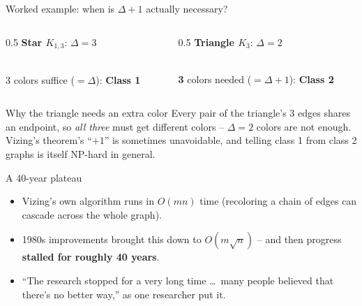 \documentclass[11pt,aspectratio=169]{beamer}
\begin{document}
\begin{frame}{Worked example: when is $\Delta+1$ actually necessary?}
  \begin{columns}
  \begin{column}{0.5\textwidth}
  \centering \textbf{Star $K_{1,3}$}: $\Delta = 3$
  \\[4pt] \footnotesize 3 colors suffice ($=\Delta$): \textbf{Class 1}
  \end{column}
  \begin{column}{0.5\textwidth}
  \centering \textbf{Triangle $K_3$}: $\Delta = 2$
  \\[4pt] \footnotesize \textbf{3} colors needed ($=\Delta+1$): \textbf{Class 2}
  \end{column}
  \end{columns}
  \vspace{0.6em}
  \begin{exampleblock}{Why the triangle needs an extra color}
    Every pair of the triangle's 3 edges shares an endpoint, so \emph{all three} must
    get different colors -- $\Delta=2$ colors are not enough. Vizing's theorem's
    ``$+1$'' is sometimes unavoidable, and telling class 1 from class 2 graphs is
    itself NP-hard in general.
  \end{exampleblock}
\end{frame}

\begin{frame}{A 40-year plateau}
  \begin{itemize}
    \item Vizing's own algorithm runs in $O(mn)$ time (recoloring a chain of edges can
    cascade across the whole graph).
    \item 1980s improvements brought this down to $O(m\sqrt n)$ -- and then progress
    \textbf{stalled for roughly 40 years}.
    \item ``The research stopped for a very long time \ldots\ many people believed that
    there's no better way,'' as one researcher put it.
  \end{itemize}
\end{frame}
\end{document}
